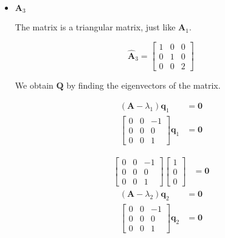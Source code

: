 \begin{itemize}
 \item $\mathbf{A}_3$

 The matrix is a triangular matrix, just like $\mathbf{A}_1$.

  \begin{equation*}
  \hat{\mathbf{A}}_3 = \begin{bmatrix}
                        1 & 0 &0\\0 & 1 & 0\\0 & 0&2
                       \end{bmatrix}
 \end{equation*}

 We obtain $\mathbf{Q}$ by finding the eigenvectors of the matrix.

 \begin{align*}
 (\mathbf{A}-\lambda_1) \mathbf{q}_1 &= \mathbf{0}\\
 \begin{bmatrix}
    0 & 0 & -1 \\
     0 & 0 & 0 \\
    0 & 0 & 1
    \end{bmatrix}\mathbf{q}_1 &= \mathbf{0}
\end{align*}

\begin{align*}
  \begin{bmatrix}
     0 & 0 & -1 \\
     0 & 0 & 0 \\
    0 & 0 & 1
    \end{bmatrix}
    \begin{bmatrix}
     1 \\ 0 \\ 0
    \end{bmatrix}
    &= \mathbf{0}
\end{align*}
\begin{align*}
 (\mathbf{A}-\lambda_2) \mathbf{q}_2 &= \mathbf{0}\\
 \begin{bmatrix}
    0 & 0 & -1 \\
     0 & 0 & 0 \\
    0 & 0 & 1
    \end{bmatrix}\mathbf{q}_2 &= \mathbf{0}
\end{align*}


\end{itemize}
